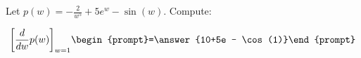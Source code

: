 \documentclass{ximera}
\author{Bart Snapp}
\begin{document}
\begin{exercise}

Let $p(w) = -\frac{2}{w^5}+5 e^w-\sin (w)$. Compute:

\[
\bigg[ \frac{d}{dw}p(w) \bigg]_{w=1}
\begin{prompt}=\answer{10+5e - \cos(1)}\end{prompt}
\]
\end{exercise}
\end{document}
